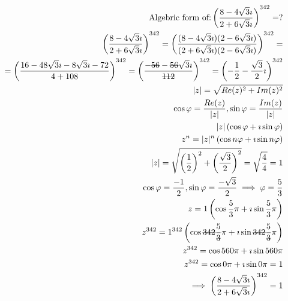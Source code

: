 \documentclass{article}
\newcommand{\stkout}[1]{\ifmmode\text{\sout{\ensuremath{#1}}}\else\sout{#1}\fi}
\begin{document}
    \begin{align*}
        \text{Algebric form of:} \left(\frac{8 - 4\sqrt3\imath}{2 + 6\sqrt3\imath}\right)^{342} = ?\\
        \left(\frac{8 - 4\sqrt3\imath}{2 + 6\sqrt3\imath}\right)^{342} =
        \left(\frac{(8 - 4\sqrt3\imath)(2 - 6\sqrt3\imath)}{(2 + 6\sqrt3\imath)(2 - 6\sqrt3\imath)}\right)^{342} =\\
        = \left(\frac{16 - 48\sqrt3\imath - 8\sqrt3\imath - 72}{4 + 108}\right)^{342}
        = \left(\frac{-\stkout{56} - \stkout{56}\sqrt3\imath}{\stkout{112}}\right)^{342}
        = \left(-\frac{1}{2} -\frac{\sqrt3}{2}\imath\right)^{342}\\
        |z| = \sqrt{Re(z) ^ 2 + Im(z) ^ 2}\\
        \cos\varphi = \frac{ Re(z) }{|z|}, \sin\varphi = \frac{Im(z)}{|z|}\\
        |z|\left(\cos\varphi + \imath\sin\varphi\right)\\
        z ^ n  = |z| ^ n\left(\cos{n\varphi} + \imath\sin{n\varphi}\right)\\
        |z| = \sqrt{\left(\frac{1}{2}\right) ^ 2 + \left(\frac{\sqrt3}{2}\right) ^ 2} = \sqrt{\frac{4}{4}} = 1\\
        \cos\varphi = \frac{-1}{2}, \sin\varphi = \frac{-\sqrt3}{2} \implies \varphi = \frac{5}{3}\\
        z = 1\left(\cos{\frac{5}{3}\pi} + \imath\sin{\frac{5}{3}\pi}\right)\\
        z ^ {342} = 1 ^ {342}\left(\cos{\stkout{342}\frac{5}{\stkout{3}}\pi} + \imath\sin{\stkout{342}\frac{5}{\stkout{3}}\pi}\right)\\
        z ^ {342} = \cos{560\pi} + \imath\sin{560\pi}\\
        z ^ {342} = \cos{0\pi} + \imath\sin{0\pi} = 1\\
        \implies \left(\frac{8 - 4\sqrt3\imath}{2 + 6\sqrt3\imath}\right)^{342} = 1
    \end{align*}
\end{document}
